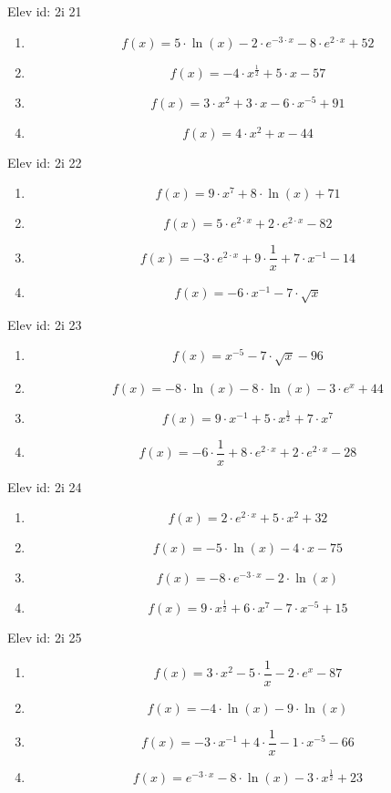 \item Elev id: 2i 21
\begin{enumerate}
\item 
$$
f(x)=5\cdot \ln(x)-2\cdot e^{-3\cdot x}-8\cdot e^{2\cdot x}+52
$$
\item 
$$
f(x)=-4\cdot x^{\frac{1}{2}}+5\cdot x-57
$$
\item 
$$
f(x)=3\cdot x^2+3\cdot x-6\cdot x^{-5}+91
$$
\item 
$$
f(x)=4\cdot x^2+x-44
$$
\end{enumerate}
\item Elev id: 2i 22
\begin{enumerate}
\item 
$$
f(x)=9\cdot x^7+8\cdot \ln(x)+71
$$
\item 
$$
f(x)=5\cdot e^{2\cdot x}+2\cdot e^{2\cdot x}-82
$$
\item 
$$
f(x)=-3\cdot e^{2\cdot x}+9\cdot \frac{1}{x}+7\cdot x^{-1}-14
$$
\item 
$$
f(x)=-6\cdot x^{-1}-7\cdot \sqrt{x}
$$
\end{enumerate}
\item Elev id: 2i 23
\begin{enumerate}
\item 
$$
f(x)=x^{-5}-7\cdot \sqrt{x}-96
$$
\item 
$$
f(x)=-8\cdot \ln(x)-8\cdot \ln(x)-3\cdot e^x+44
$$
\item 
$$
f(x)=9\cdot x^{-1}+5\cdot x^{\frac{1}{2}}+7\cdot x^7
$$
\item 
$$
f(x)=-6\cdot \frac{1}{x}+8\cdot e^{2\cdot x}+2\cdot e^{2\cdot x}-28
$$
\end{enumerate}
\item Elev id: 2i 24
\begin{enumerate}
\item 
$$
f(x)=2\cdot e^{2\cdot x}+5\cdot x^2+32
$$
\item 
$$
f(x)=-5\cdot \ln(x)-4\cdot x-75
$$
\item 
$$
f(x)=-8\cdot e^{-3\cdot x}-2\cdot \ln(x)
$$
\item 
$$
f(x)=9\cdot x^{\frac{1}{2}}+6\cdot x^7-7\cdot x^{-5}+15
$$
\end{enumerate}
\item Elev id: 2i 25
\begin{enumerate}
\item 
$$
f(x)=3\cdot x^2-5\cdot \frac{1}{x}-2\cdot e^x-87
$$
\item 
$$
f(x)=-4\cdot \ln(x)-9\cdot \ln(x)
$$
\item 
$$
f(x)=-3\cdot x^{-1}+4\cdot \frac{1}{x}-1\cdot x^{-5}-66
$$
\item 
$$
f(x)=e^{-3\cdot x}-8\cdot \ln(x)-3\cdot x^{\frac{1}{2}}+23
$$
\end{enumerate}
